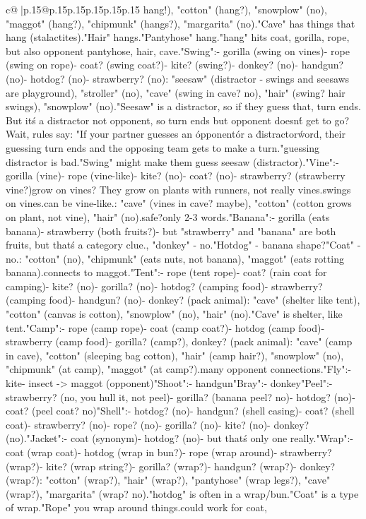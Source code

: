 \documentclass{article}
\begin{document}
{\begin{supertabular}{c@{$\;$}|p{.15\linewidth}@{}p{.15\linewidth}p{.15\linewidth}p{.15\linewidth}p{.15\linewidth}p{.15\linewidth}}
{{{hang!), "cotton" (hang?), "snowplow" (no), "maggot" (hang?), "chipmunk" (hangs?), "margarita" (no).\n"Cave" has things that hang (stalactites).\n"Hair" hangs.\n"Pantyhose" hang.\nSo "hang" hits coat, gorilla, rope, but also opponent pantyhose, hair, cave.\n\n"Swing":\n- gorilla (swing on vines)\n- rope (swing on rope)\n- coat? (swing coat?)\n- kite? (swing?)\n- donkey? (no)\n- handgun? (no)\n- hotdog? (no)\n- strawberry? (no)\nOpponent: "seesaw" (distractor - swings and seesaws are playground), "stroller" (no), "cave" (swing in cave? no), "hair" (swing? hair swings), "snowplow" (no).\n"Seesaw" is a distractor, so if they guess that, turn ends. But it\'s a distractor not opponent, so turn ends but opponent doesn\'t get to go? Wait, rules say: "If your partner guesses an \'opponent\' or a \'distractor\' word, their guessing turn ends and the opposing team gets to make a turn."\nSo guessing distractor is bad.\n"Swing" might make them guess seesaw (distractor).\n\n"Vine":\n- gorilla (vine)\n- rope (vine-like)\n- kite? (no)\n- coat? (no)\n- strawberry? (strawberry vine?)\nStrawberries grow on vines? They grow on plants with runners, not really vines.\nGorilla swings on vines.\nRope can be vine-like.\nOpponent: "cave" (vines in cave? maybe), "cotton" (cotton grows on plant, not vine), "hair" (no).\nMaybe safe?\nBut only 2-3 words.\n\n"Banana":\n- gorilla (eats banana)\n- strawberry (both fruits?)\n- but "strawberry" and "banana" are both fruits, but that\'s a category clue.\nAlso, "donkey" - no.\n"Hotdog" - banana shape?\n"Coat" - no.\nOpponent: "cotton" (no), "chipmunk" (eats nuts, not banana), "maggot" (eats rotting banana).\nSo connects to maggot.\n\n"Tent":\n- rope (tent rope)\n- coat? (rain coat for camping)\n- kite? (no)\n- gorilla? (no)\n- hotdog? (camping food)\n- strawberry? (camping food)\n- handgun? (no)\n- donkey? (pack animal)\nOpponent: "cave" (shelter like tent), "cotton" (canvas is cotton), "snowplow" (no), "hair" (no).\n"Cave" is shelter, like tent.\n\n"Camp":\n- rope (camp rope)\n- coat (camp coat?)\n- hotdog (camp food)\n- strawberry (camp food)\n- gorilla? (camp?), donkey? (pack animal)\nOpponent: "cave" (camp in cave), "cotton" (sleeping bag cotton), "hair" (camp hair?), "snowplow" (no), "chipmunk" (at camp), "maggot" (at camp?).\nToo many opponent connections.\n\n"Fly":\n- kite\n- insect -> maggot (opponent)\n\n"Shoot":\n- handgun\n\n"Bray":\n- donkey\n\n"Peel":\n- strawberry? (no, you hull it, not peel)\n- gorilla? (banana peel? no)\n- hotdog? (no)\n- coat? (peel coat? no)\n\n"Shell":\n- hotdog? (no)\n- handgun? (shell casing)\n- coat? (shell coat)\n- strawberry? (no)\n- rope? (no)\n- gorilla? (no)\n- kite? (no)\n- donkey? (no).\n\n"Jacket":\n- coat (synonym)\n- hotdog? (no)\n- but that\'s only one really.\n\n"Wrap":\n- coat (wrap coat)\n- hotdog (wrap in bun?)\n- rope (wrap around)\n- strawberry? (wrap?)\n- kite? (wrap string?)\n- gorilla? (wrap?)\n- handgun? (wrap?)\n- donkey? (wrap?)\nOpponent: "cotton" (wrap?), "hair" (wrap?), "pantyhose" (wrap legs?), "cave" (wrap?), "margarita" (wrap? no).\nBut "hotdog" is often in a wrap/bun.\n"Coat" is a type of wrap.\n"Rope" you wrap around things.\nThis could work for coat, }}}
\end{supertabular}}
\end{document}
